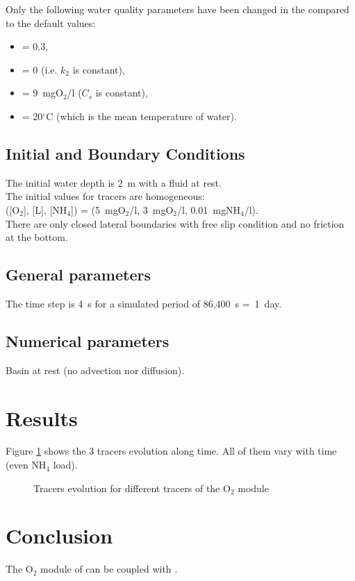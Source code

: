Only the following water quality parameters have been changed
in the \waqtel {} compared to the default values:
\begin{itemize}
\item {} = 0.3,
\item {} = 0 (i.e. $k_2$ is constant),
\item {} = 9~mgO$_2$/l ($C_s$ is constant),
\item {} = 20$^\circ$C (which is the mean temperature of water).
\end{itemize}

\subsection{Initial and Boundary Conditions}

The initial water depth is 2~m with a fluid at rest.\\
%
The initial values for tracers are homogeneous:\\
([O$_2$], [L], [NH$_4$]) =
(5~mgO$_2$/l, 3~mgO$_2$/l, 0.01~mgNH$_4$/l).\\
%
There are only closed lateral boundaries with free slip condition and no
friction at the bottom.

\subsection{General parameters}

The time step is 4~s for a simulated period of 86,400~s =~1~day.

\subsection{Numerical parameters}

Basin at rest (no advection nor diffusion).

\section{Results}

Figure \ref{fig:waq2d_o2:res} shows the 3 tracers evolution along time.
All of them vary with time (even NH$_4$ load).

\begin{figure} [H]
\centering
{}
 \caption{Tracers evolution for different tracers of the O$_2$ module}
 \label{fig:waq2d_o2:res}
\end{figure}

\section{Conclusion}

The O$_2$ module of \waqtel can be coupled with .
